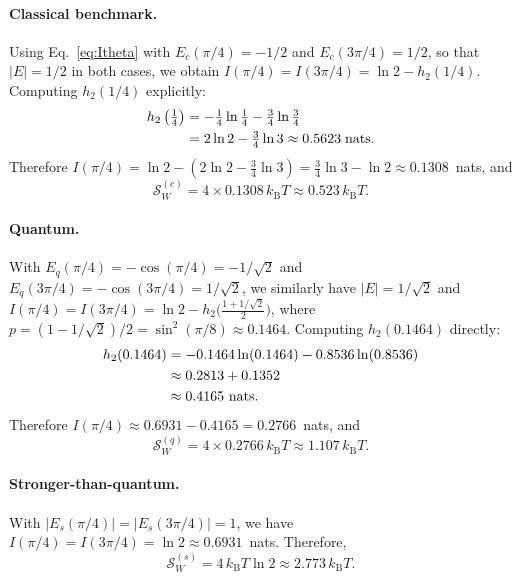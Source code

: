\documentclass[pra,twocolumn,showpacs,preprintnumbers,amsmath,amssymb,longbibliography,
               superscriptaddress]{revtex4-2}
\begin{document}
{\paragraph{Classical benchmark.}
Using Eq.~\eqref{eq:Itheta} with $E_c(\pi/4) = -1/2$ and
$E_c(3\pi/4) = 1/2$, so that $|E| = 1/2$ in both cases,
we obtain $I(\pi/4) = I(3\pi/4) = \ln 2 - h_2(1/4)$.
Computing $h_2(1/4)$ explicitly:
\begin{align}
h_2\left(\tfrac{1}{4}\right) &= -\tfrac{1}{4}\ln\tfrac{1}{4}
             -\tfrac{3}{4}\ln\tfrac{3}{4} \notag\\
          &= 2\ln 2 - \tfrac{3}{4}\ln 3
           \approx 0.5623 \;\text{nats}.
\label{eq:h2_quarter}
\end{align}
Therefore
$I(\pi/4) = \ln 2 - (2\ln 2 - \tfrac{3}{4}\ln 3)
           = \tfrac{3}{4}\ln 3 - \ln 2
           \approx 0.1308$~nats, and
\begin{equation}
\mathcal{S}_W^{(c)}
  = 4 \times 0.1308\, k_{\mathrm{B}}T
  \approx 0.523\, k_{\mathrm{B}}T.
\label{eq:SW_classical}
\end{equation}}

{\paragraph{Quantum.}
With $E_q(\pi/4) = -\cos(\pi/4) = -1/\sqrt{2}$ and
$E_q(3\pi/4) = -\cos(3\pi/4) = 1/\sqrt{2}$, we similarly have
$|E| = 1/\sqrt{2}$ and
$I(\pi/4) = I(3\pi/4)
  = \ln 2 - h_2\!\bigl(\tfrac{1+1/\sqrt{2}}{2}\bigr)$,
where $p = (1-1/\sqrt{2})/2 = \sin^2(\pi/8) \approx 0.1464$.
Computing $h_2(0.1464)$ directly:
\begin{align}
h_2(0.1464) &= -0.1464\ln(0.1464) - 0.8536\ln(0.8536)
\notag\\
  &\approx 0.2813 + 0.1352 \notag\\
  &\approx 0.4165~\text{nats}.
\label{eq:h2_quantum}
\end{align}
Therefore $I(\pi/4) \approx 0.6931 - 0.4165
  = 0.2766$~nats, and
\begin{equation}
\mathcal{S}_W^{(q)}
  = 4 \times 0.2766\, k_{\mathrm{B}}T
  \approx 1.107\, k_{\mathrm{B}}T.
\label{eq:SW_quantum}
\end{equation}}

{\paragraph{Stronger-than-quantum.}
With $|E_s(\pi/4)| = |E_s(3\pi/4)| = 1$, we have
$I(\pi/4) = I(3\pi/4) = \ln 2 \approx 0.6931$~nats.
Therefore,
\begin{equation}
\mathcal{S}_W^{(s)}
  = 4\,k_{\mathrm{B}}T\ln 2
  \approx 2.773\, k_{\mathrm{B}}T.
\label{eq:SW_superquantum}
\end{equation}}
\end{document}
